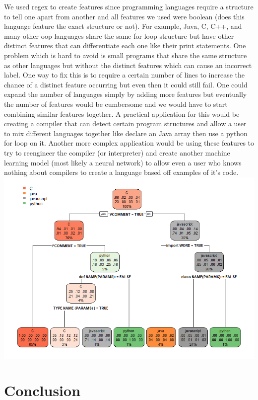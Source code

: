 \documentclass[11pt]{article}
\makeatletter
\def\maxwidth{\ifdim\Gin@nat@width>\linewidth\linewidth
    \else\Gin@nat@width\fi}
\let\Oldincludegraphics\includegraphics
\renewcommand{\includegraphics}[1]{\Oldincludegraphics[width=.8\maxwidth]{#1}}
\makeatother
\begin{document}
We used regex to create features since programming languages require a
structure to tell one apart from another and all features we used were
boolean (does this language feature the exact structure or not). For
example, Java, C, C++, and many other oop languages share the same for
loop structure but have other distinct features that can differentiate
each one like their print statements. One problem which is hard to avoid
is small programs that share the same structure as other languages but
without the distinct features which can cause an incorrect label. One
way to fix this is to require a certain number of lines to increase the
chance of a distinct feature occurring but even then it could still
fail. One could expand the number of languages simply by adding more
features but eventually the number of features would be cumbersome and
we would have to start combining similar features together. A practical
application for this would be creating a compiler that can detect
certain program structures and allow a user to mix different languages
together like declare an Java array then use a python for loop on it.
Another more complex application would be using these features to try to
reengineer the compiler (or interpreter) and create another machine
learning model (most likely a neural network) to allow even a user who
knows nothing about compilers to create a language based off examples of
it's code. \includegraphics{Rplot.png}

    \section{Conclusion}\label{conclusion}
\end{document}
